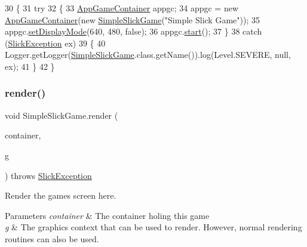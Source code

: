 \begin{DoxyCode}
30     \{
31         \textcolor{keywordflow}{try}
32         \{
33             \mbox{\hyperlink{classorg_1_1newdawn_1_1slick_1_1_app_game_container}{AppGameContainer}} appgc;
34             appgc = \textcolor{keyword}{new} \mbox{\hyperlink{classorg_1_1newdawn_1_1slick_1_1_app_game_container}{AppGameContainer}}(\textcolor{keyword}{new} \mbox{\hyperlink{class_simple_slick_game_a4e58074dc344280962a5db792e242612}{SimpleSlickGame}}(\textcolor{stringliteral}{"Simple Slick
       Game"}));
35             appgc.\mbox{\hyperlink{classorg_1_1newdawn_1_1slick_1_1_app_game_container_aa2de68db61ddd3917a8edc0177ebdfe3}{setDisplayMode}}(640, 480, \textcolor{keyword}{false});
36             appgc.\mbox{\hyperlink{classorg_1_1newdawn_1_1slick_1_1_app_game_container_adcadc0e560e64d03be24c817931fdd54}{start}}();
37         \}
38         \textcolor{keywordflow}{catch} (\mbox{\hyperlink{classorg_1_1newdawn_1_1slick_1_1_slick_exception}{SlickException}} ex)
39         \{
40             Logger.getLogger(\mbox{\hyperlink{class_simple_slick_game}{SimpleSlickGame}}.class.getName()).log(Level.SEVERE, null, ex);
41         \}
42     \}
\end{DoxyCode}
\mbox{\label{class_simple_slick_game_a7c65120173cde5294f3c4b7aa733b00a}} 
\subsubsection{\texorpdfstring{render()}{render()}}
{\footnotesize\ttfamily void Simple\+Slick\+Game.\+render (\begin{DoxyParamCaption}\item[{\mbox{\hyperlink{classorg_1_1newdawn_1_1slick_1_1_game_container}{Game\+Container}}}]{container,  }\item[{\mbox{\hyperlink{classorg_1_1newdawn_1_1slick_1_1_graphics}{Graphics}}}]{g }\end{DoxyParamCaption}) throws \mbox{\hyperlink{classorg_1_1newdawn_1_1slick_1_1_slick_exception}{Slick\+Exception}}\hspace{0.3cm}{\ttfamily [inline]}}

Render the game\textquotesingle{}s screen here.


\begin{DoxyParams}{Parameters}
{\em container} & The container holing this game \\
\hline
{\em g} & The graphics context that can be used to render. However, normal rendering routines can also be used. \\
\hline
\end{DoxyParams}

